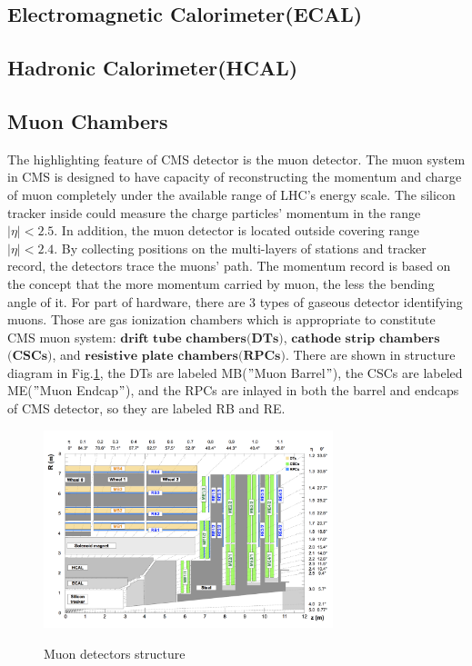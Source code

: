 		\subsection{Electromagnetic Calorimeter(ECAL)}
		\label{ssec:ecal}



		\subsection{Hadronic Calorimeter(HCAL)}
		\label{ssec:hcal}

		\subsection{Muon Chambers}
		\label{ssec:muon_detector}

		The highlighting feature of CMS detector is the muon detector. The muon system in CMS is designed to have capacity of reconstructing the momentum and charge of muon completely under the available range of LHC's energy scale. The silicon tracker inside could measure the charge particles' momentum in the range $|\eta|<2.5$. In addition, the muon detector is located outside covering range $|\eta|<2.4$. By collecting positions on the multi-layers of stations and tracker record, the detectors trace the muons' path. The momentum record is based on the concept that the more momentum carried by muon, the less the bending angle of it. For part of hardware, there are 3 types of gaseous detector identifying muons. Those are gas ionization chambers which is appropriate to constitute CMS muon system: $\textbf{drift}$ $\textbf{tube}$ $\textbf{chambers}$$\textbf{(DTs)}$, $\textbf{cathode}$ $\textbf{strip}$ $\textbf{chambers}$$\textbf{(CSCs)}$, and $\textbf{resistive}$ $\textbf{plate}$ $\textbf{chambers}$$\textbf{(RPCs)}$. There are shown in structure diagram in Fig.\ref{ExpApp:fig:muon_chamber1}, the DTs are labeled MB($"$Muon Barrel$"$), the CSCs are labeled ME($"$Muon Endcap$"$), and the RPCs are inlayed in both the barrel and endcaps of CMS detector, so they are labeled RB and RE.

		\begin{figure}[H]
		\centering{}
	    	\includegraphics[width=0.75\textwidth]{Figures/ExpApparatus/muon_chamber.png}\\
		\caption{Muon detectors structure\cite{Sirunyan:2018fp}}
		\label{ExpApp:fig:muon_chamber1}
		\end{figure}

